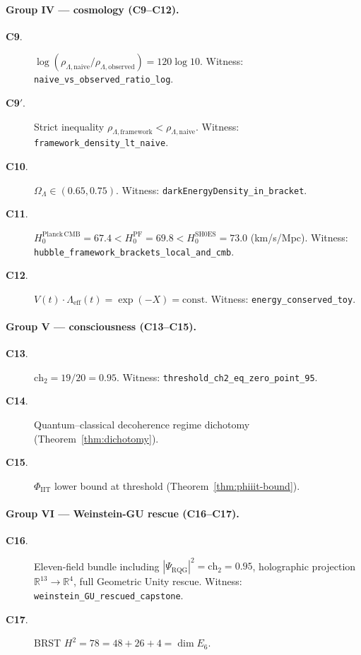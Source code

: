 \documentclass[11pt,a4paper]{article}
\theoremstyle{definition}
\theoremstyle{remark}
\newcommand{\reals}{\mathbb{R}}
\newcommand{\Lambdaeff}{\Lambda_{\mathrm{eff}}}
\newcommand{\Phiiit}{\Phi_{\mathrm{IIT}}}
\newcommand{\PsiRQG}{\Psi_{\mathrm{RQG}}}
\newcommand{\chtwo}{\mathrm{ch}_{2}}
\newcommand{\lean}[1]{\texttt{\small #1}}
\begin{document}
\paragraph{Group IV --- cosmology (C9--C12).}

\begin{description}
\item[\textbf{C9}.] $\log(\rho_{\Lambda,\mathrm{naive}}
/ \rho_{\Lambda,\mathrm{observed}}) = 120 \log 10$. Witness:
\lean{naive\_vs\_observed\_ratio\_log}.
\item[\textbf{C9}$'$.] Strict inequality
$\rho_{\Lambda,\mathrm{framework}} < \rho_{\Lambda,\mathrm{naive}}$.
Witness: \lean{framework\_density\_lt\_naive}.
\item[\textbf{C10}.] $\Omega_{\Lambda} \in (0.65, 0.75)$.
Witness: \lean{darkEnergyDensity\_in\_bracket}.
\item[\textbf{C11}.] $H_{0}^{\mathrm{Planck\,CMB}}
= 67.4 < H_{0}^{\mathrm{PF}} = 69.8 < H_{0}^{\mathrm{SH0ES}} = 73.0$
(km/s/Mpc). Witness:
\lean{hubble\_framework\_brackets\_local\_and\_cmb}.
\item[\textbf{C12}.] $V(t) \cdot \Lambdaeff(t) = \exp(-X)
= \mathrm{const}$. Witness: \lean{energy\_conserved\_toy}.
\end{description}

\paragraph{Group V --- consciousness (C13--C15).}

\begin{description}
\item[\textbf{C13}.] $\chtwo = 19/20 = 0.95$. Witness:
\lean{threshold\_ch2\_eq\_zero\_point\_95}.
\item[\textbf{C14}.] Quantum--classical decoherence regime
dichotomy (Theorem~\ref{thm:dichotomy}).
\item[\textbf{C15}.] $\Phiiit$ lower bound at threshold
(Theorem~\ref{thm:phiiit-bound}).
\end{description}

\paragraph{Group VI --- Weinstein-GU rescue (C16--C17).}

\begin{description}
\item[\textbf{C16}.] Eleven-field bundle including
$|\PsiRQG|^{2} = \chtwo = 0.95$, holographic projection
$\reals^{13} \to \reals^{4}$, full Geometric Unity rescue.
Witness: \lean{weinstein\_GU\_rescued\_capstone}.
\item[\textbf{C17}.] BRST $H^{2} = 78 = 48 + 26 + 4 = \dim E_{6}$.
\end{description}
\end{document}
